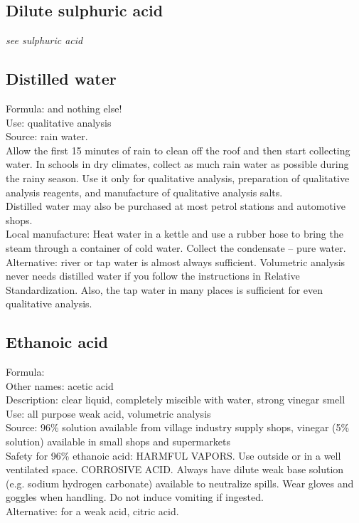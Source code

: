 \subsection*{Dilute sulphuric acid}
\textit{see sulphuric acid}

\subsection*{Distilled water}
Formula:  and nothing else!\\
Use: qualitative analysis\\
Source: rain water.\\
Allow the first 15 minutes of rain to clean off the roof 
and then start collecting water. 
In schools in dry climates, 
collect as much rain water as possible during the rainy season. 
Use it only for qualitative analysis, 
preparation of qualitative analysis reagents, 
and manufacture of qualitative analysis salts.\\ 
Distilled water may also be purchased at most petrol stations 
and automotive shops.\\
Local manufacture: Heat water in a kettle 
and use a rubber hose to bring the steam through a container of cold water. 
Collect the condensate -- pure water.\\
Alternative: river or tap water is almost always sufficient. 
Volumetric analysis never needs distilled water 
if you follow the instructions in Relative Standardization. 
Also, 
the tap water in many places is sufficient for even qualitative analysis.
\subsection*{Ethanoic acid}
\label{sec:ethanoic}
Formula: \\
Other names: acetic acid\\
Description: clear liquid, 
completely miscible with water, 
strong vinegar smell\\
Use: all purpose weak acid, 
volumetric analysis\\
Source: 96\% solution available from village industry supply shops, 
vinegar (5\% solution) available in small shops and supermarkets\\
Safety for 96\% ethanoic acid: HARMFUL VAPORS. 
Use outside or in a well ventilated space. 
CORROSIVE ACID. 
Always have dilute weak base solution (e.g. 
sodium hydrogen carbonate) available to neutralize spills. 
Wear gloves and goggles when handling. 
Do not induce vomiting if ingested.\\
Alternative: for a weak acid, 
citric acid. 
